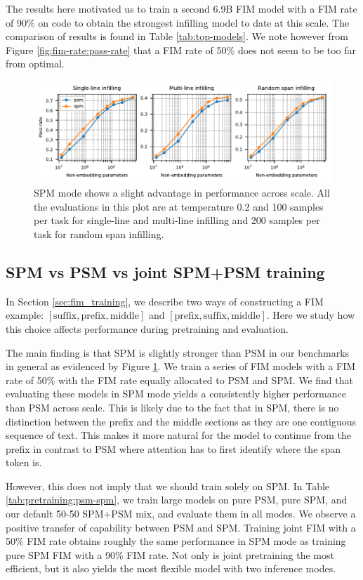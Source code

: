 \documentclass[postscript]{article}
\begin{document}
The results here motivated us to train a second 6.9B FIM model with a FIM rate of 90\% on code to obtain the strongest infilling model to date at this scale. The comparison of results is found in Table \ref{tab:top-models}. We note however from Figure \ref{fig:fim-rate:pass-rate} that a FIM rate of 50\% does not seem to be too far from optimal. 

\begin{figure}[ht!]
\centering
\includegraphics[width=\textwidth]{figures/spm-psm-3evals.pdf}
\caption{SPM mode shows a slight advantage in performance across scale. All the evaluations in this plot are at temperature 0.2 and 100 samples per task for single-line and multi-line infilling and 200 samples per task for random span infilling.}
\label{fig:pretraining:psm-spm}
\end{figure}
\subsection{SPM vs PSM vs joint SPM+PSM training}
\label{sec:pretraining:psm-spm}
In Section \ref{sec:fim_training}, we describe two ways of constructing a FIM example: 
$[\text{suffix}, \text{prefix}, \text{middle}]$ and
$[\text{prefix}, \text{suffix}, \text{middle}]$.
Here we study how this choice affects performance  during pretraining and evaluation.

The main finding is that SPM is slightly stronger than PSM in our benchmarks in general as evidenced by Figure \ref{fig:pretraining:psm-spm}. We train a series of FIM models with a FIM rate of 50\% with the FIM rate equally allocated to PSM and SPM. We find that evaluating these models in SPM mode yields a consistently higher performance than PSM across scale. This is likely due to the fact that in SPM, there is no distinction between the prefix and the middle sections as they are one contiguous sequence of text. This makes it more natural for the model to continue from the prefix in contrast to PSM where attention has to first identify where the span token is.
 

However, this does not imply that we should train solely on SPM. In Table \ref{tab:pretraining:psm-spm}, we train large models on pure PSM, pure SPM, and our default 50-50 SPM+PSM mix, and evaluate them in all modes. We observe a positive transfer of capability between PSM and SPM. Training joint FIM with a 50\% FIM rate obtains roughly the same performance in SPM mode as training pure SPM FIM with a 90\% FIM rate. Not only is joint pretraining the most efficient, but it also yields the most flexible model with two inference modes.
\end{document}
